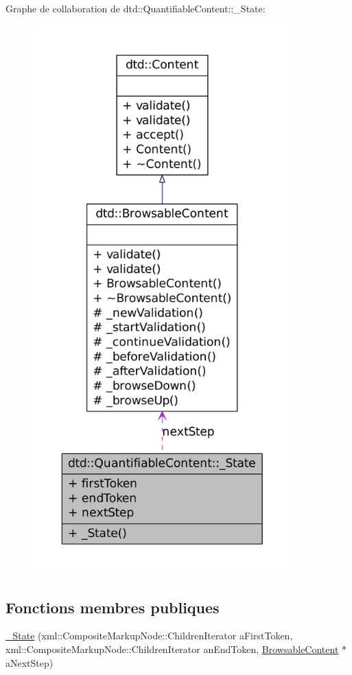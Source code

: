 Graphe de collaboration de dtd::QuantifiableContent::\_\-State:\nopagebreak
\begin{figure}[H]
\begin{center}
\leavevmode
\includegraphics[height=600pt]{structdtd_1_1_quantifiable_content_1_1___state__coll__graph}
\end{center}
\end{figure}
\subsection*{Fonctions membres publiques}
\begin{DoxyCompactItemize}
\item 
\hyperlink{structdtd_1_1_quantifiable_content_1_1___state_a96e685e2095dcc538e3f190f73b0efcf}{\_\-State} (xml::CompositeMarkupNode::ChildrenIterator aFirstToken, xml::CompositeMarkupNode::ChildrenIterator anEndToken, \hyperlink{classdtd_1_1_browsable_content}{BrowsableContent} $\ast$aNextStep)
\end{DoxyCompactItemize}
